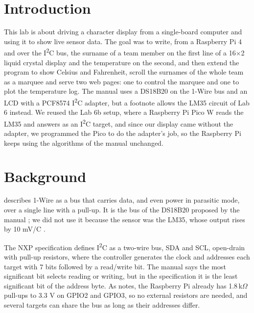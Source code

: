 \documentclass[12pt,letterpaper]{article}
\begin{document}
\thispagestyle{firstpage}

\section{Introduction}
This lab is about driving a character display from a single-board computer and using it to show live sensor data. The goal was to write, from a Raspberry Pi 4 and over the I\textsuperscript{2}C bus, the surname of a team member on the first line of a 16$\times$2 liquid crystal display and the temperature on the second, and then extend the program to show Celsius and Fahrenheit, scroll the surnames of the whole team as a marquee and serve two web pages: one to control the marquee and one to plot the temperature log. The manual uses a DS18B20 on the 1-Wire bus and an LCD with a PCF8574 I\textsuperscript{2}C adapter, but a footnote allows the LM35 circuit of Lab 6 instead. We reused the Lab 6b setup, where a Raspberry Pi Pico W reads the LM35 and answers as an I\textsuperscript{2}C target, and since our display came without the adapter, we programmed the Pico to do the adapter's job, so the Raspberry Pi keeps using the algorithms of the manual unchanged.

\section{Background}
\citet{linke2008} describes 1-Wire as a bus that carries data, and even power in parasitic mode, over a single line with a pull-up. It is the bus of the DS18B20 proposed by the manual \citep{matamoros2025}; we did not use it because the sensor was the LM35, whose output rises by 10 mV/\textdegree C \citep{ti2017}.

The NXP specification \citeyearpar{nxp2021} defines I\textsuperscript{2}C as a two-wire bus, SDA and SCL, open-drain with pull-up resistors, where the controller generates the clock and addresses each target with 7 bits followed by a read/write bit. The manual says the most significant bit selects reading or writing, but in the specification it is the least significant bit of the address byte. As \citet{molloy2016} notes, the Raspberry Pi already has 1.8\,k$\Omega$ pull-ups to 3.3 V on GPIO2 and GPIO3, so no external resistors are needed, and several targets can share the bus as long as their addresses differ.
\end{document}
